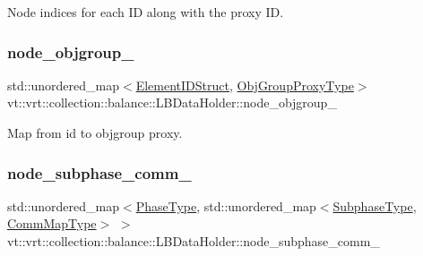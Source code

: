 Node indices for each ID along with the proxy ID. 

\mbox{\label{structvt_1_1vrt_1_1collection_1_1balance_1_1_l_b_data_holder_ab862d2f1b884256fc88634757f37bb80}} 
\subsubsection{\texorpdfstring{node\+\_\+objgroup\+\_\+}{node\_objgroup\_}}
{\footnotesize\ttfamily std\+::unordered\+\_\+map$<$\hyperlink{namespacevt_1_1vrt_1_1collection_1_1balance_a9f5b53fafb270212279a4757d2c4cd28}{Element\+I\+D\+Struct}, \hyperlink{namespacevt_ad7cae989df485fccca57f0792a880a8e}{Obj\+Group\+Proxy\+Type}$>$ vt\+::vrt\+::collection\+::balance\+::\+L\+B\+Data\+Holder\+::node\+\_\+objgroup\+\_\+}



Map from id to objgroup proxy. 

\mbox{\label{structvt_1_1vrt_1_1collection_1_1balance_1_1_l_b_data_holder_a733c6d7b9fb2bb0c67588eed9b9cd5fc}} 
\subsubsection{\texorpdfstring{node\+\_\+subphase\+\_\+comm\+\_\+}{node\_subphase\_comm\_}}
{\footnotesize\ttfamily std\+::unordered\+\_\+map$<$\hyperlink{namespacevt_a46ce6733d5cdbd735d561b7b4029f6d7}{Phase\+Type}, std\+::unordered\+\_\+map$<$\hyperlink{namespacevt_ae78cbfdf1e57470e33eedb074f2beeba}{Subphase\+Type}, \hyperlink{namespacevt_1_1vrt_1_1collection_1_1balance_a01ee1fb0ae2da1d2ab7fdca3be9ae351}{Comm\+Map\+Type}$>$ $>$ vt\+::vrt\+::collection\+::balance\+::\+L\+B\+Data\+Holder\+::node\+\_\+subphase\+\_\+comm\+\_\+}



